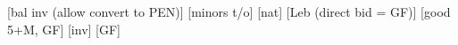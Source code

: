 \begin{bidsemi}
    [bal inv (allow convert to PEN)]
    [minors t/o]
    [nat]
    [Leb (direct bid = GF)]
    [good 5+M, GF]
    [inv]
    [GF]
\end{bidsemi}